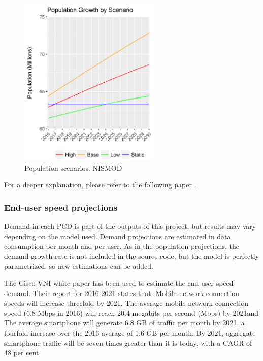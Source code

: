 
\begin{figure}[H]
	\begin{Center}
		\includegraphics[width=0.60\textwidth]{./media/image19.png}
		\caption{Population scenarios. NISMOD\cite{3-07}}
	\end{Center}
\end{figure}
For a deeper explanation, please refer to the following paper \cite{3-03}.

\subsubsection*{End-user speed projections}
Demand in each PCD is part of the outputs of this project, but results may vary depending on the model used. Demand projections are estimated in data consumption per month and per user. As in the population projections, the demand growth rate is not included in the source code, but the model is perfectly parametrized, so new estimations can be added. \par

The Cisco VNI white paper \cite{3-08} has been used to estimate the end-user speed demand. Their report for 2016-2021 states that: \guillemotleft Mobile network connection speeds will increase threefold by 2021. The average mobile network connection speed (6.8 Mbps in 2016) will reach 20.4 megabits per second (Mbps) by 2021\guillemotright  and \guillemotleft The average smartphone will generate 6.8 GB of traffic per month by 2021, a fourfold increase over the 2016 average of 1.6 GB per month. By 2021, aggregate smartphone traffic will be seven times greater than it is today, with a CAGR of 48 per cent\guillemotright .



